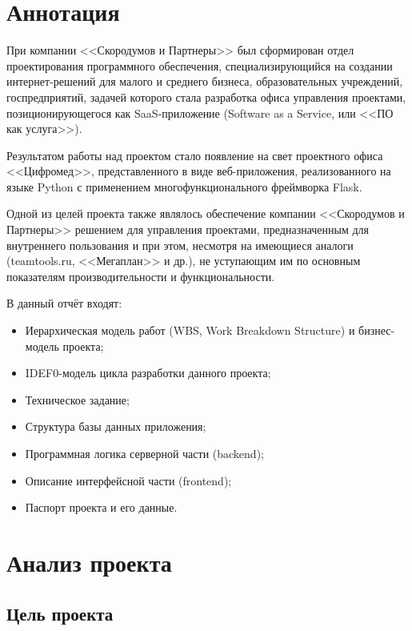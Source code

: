 \documentclass[a4paper, 14pt]{extarticle}
\begin{document}

\newpage


\tableofcontents
\newpage


\section{Аннотация}
При компании <<Скородумов и Партнеры>> был сформирован отдел проектирования программного обеспечения, специализирующийся на создании интернет-решений для малого и среднего бизнеса, образовательных учреждений, госпредприятий, задачей которого стала разработка офиса управления проектами, позиционирующегося как SaaS-приложение (Software as a Service, или <<ПО как услуга>>).

Результатом работы над проектом стало появление на свет проектного офиса <<Цифромед>>, представленного в виде веб-приложения, реализованного на языке Python с применением многофункционального фреймворка Flask.

Одной из целей проекта также являлось обеспечение компании <<Скородумов и Партнеры>> решением для управления проектами, предназначенным для внутреннего пользования и при этом, несмотря на имеющиеся аналоги (teamtools.ru, <<Мегаплан>> и др.), не уступающим им по основным показателям производительности и функциональности.


В данный отчёт входят:

\begin{itemize}
\setlength{\itemsep}{-1mm}
\item Иерархическая модель работ (WBS, Work Breakdown Structure) и бизнес-модель проекта;
\item IDEF0-модель цикла разработки данного проекта;
\item Техническое задание;
\item Структура базы данных приложения;
\item Программная логика серверной части (backend);
\item Описание интерфейсной части (frontend);
\item Паспорт проекта и его данные.
\end{itemize}

\newpage


\section{Анализ проекта}
\subsection{Цель проекта}
\end{document}
